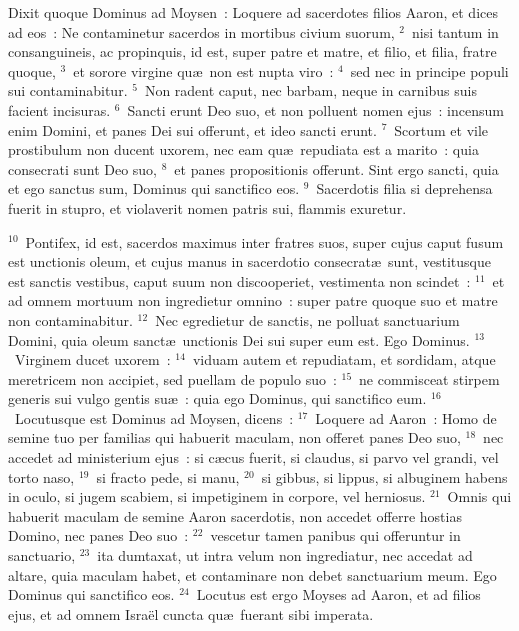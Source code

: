 \lettrine[lines=3,image=true,loversize=0.05,lraise=-0.03]{D}{}ixit quoque Dominus ad Moysen~: Loquere ad sacerdotes filios Aaron, et dices ad eos~: Ne contaminetur sacerdos in mortibus civium suorum,
${}^{2}$~nisi tantum in consanguineis, ac propinquis, id est, super patre et matre, et filio, et filia, fratre quoque,
${}^{3}$~et sorore virgine qu\ae\ non est nupta viro~:
${}^{4}$~sed nec in principe populi sui contaminabitur.
${}^{5}$~Non radent caput, nec barbam, neque in carnibus suis facient incisuras.
${}^{6}$~Sancti erunt Deo suo, et non polluent nomen ejus~: incensum enim Domini, et panes Dei sui offerunt, et ideo sancti erunt.
${}^{7}$~Scortum et vile prostibulum non ducent uxorem, nec eam qu\ae\ repudiata est a marito~: quia consecrati sunt Deo suo,
${}^{8}$~et panes propositionis offerunt. Sint ergo sancti, quia et ego sanctus sum, Dominus qui sanctifico eos.
${}^{9}$~Sacerdotis filia si deprehensa fuerit in stupro, et violaverit nomen patris sui, flammis exuretur.


${}^{10}$~Pontifex, id est, sacerdos maximus inter fratres suos, super cujus caput fusum est unctionis oleum, et cujus manus in sacerdotio consecrat\ae\ sunt, vestitusque est sanctis vestibus, caput suum non discooperiet, vestimenta non scindet~:
${}^{11}$~et ad omnem mortuum non ingredietur omnino~: super patre quoque suo et matre non contaminabitur.
${}^{12}$~Nec egredietur de sanctis, ne polluat sanctuarium Domini, quia oleum sanct\ae\ unctionis Dei sui super eum est. Ego Dominus.
${}^{13}$~Virginem ducet uxorem~:
${}^{14}$~viduam autem et repudiatam, et sordidam, atque meretricem non accipiet, sed puellam de populo suo~:
${}^{15}$~ne commisceat stirpem generis sui vulgo gentis su\ae~: quia ego Dominus, qui sanctifico eum.
${}^{16}$~Locutusque est Dominus ad Moysen, dicens~:
${}^{17}$~Loquere ad Aaron~: Homo de semine tuo per familias qui habuerit maculam, non offeret panes Deo suo,
${}^{18}$~nec accedet ad ministerium ejus~: si c\ae cus fuerit, si claudus, si parvo vel grandi, vel torto naso,
${}^{19}$~si fracto pede, si manu,
${}^{20}$~si gibbus, si lippus, si albuginem habens in oculo, si jugem scabiem, si impetiginem in corpore, vel herniosus.
${}^{21}$~Omnis qui habuerit maculam de semine Aaron sacerdotis, non accedet offerre hostias Domino, nec panes Deo suo~:
${}^{22}$~vescetur tamen panibus qui offeruntur in sanctuario,
${}^{23}$~ita dumtaxat, ut intra velum non ingrediatur, nec accedat ad altare, quia maculam habet, et contaminare non debet sanctuarium meum. Ego Dominus qui sanctifico eos.
${}^{24}$~Locutus est ergo Moyses ad Aaron, et ad filios ejus, et ad omnem Isra\"el cuncta qu\ae\ fuerant sibi imperata.

